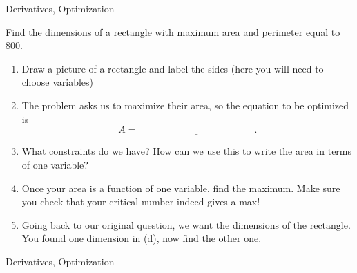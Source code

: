 \begin{tagblock}{Derivatives, Optimization}

\begin{question}

Find the dimensions of a rectangle with maximum area and perimeter equal to $800$.
\begin{enumerate}
\item Draw a picture of a rectangle and label the sides (here you will need to choose variables)

\vspace{1in}
\item The problem asks us to maximize their area, so the equation to be optimized is\\
\bigskip
 $$A=\underline{\hspace{2in}} .$$
 \item What constraints do we have?  How can we use this to write the area in terms of one variable?
 
 \vspace{1.5in} 
 \item Once your area is a function of one variable, find the maximum.  Make sure you check that your critical number indeed gives a max!
 
\vfill
 \item Going back to our original question, we want the dimensions of the rectangle.  You found one dimension in (d), now find the other one.
 
 \end{enumerate}



	
\begin{tags}
	   Derivatives, Optimization

\end{tags}
	
\begin{diary}
\end{diary}
	
\begin{solution}
	   
\end{solution}
	
\end{question}

\end{tagblock}


